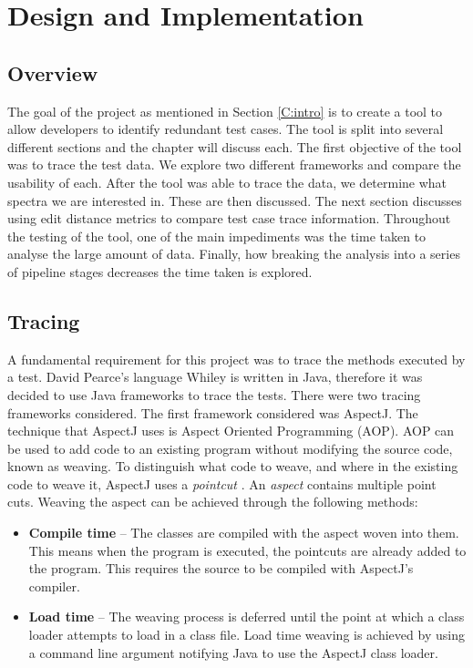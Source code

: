 \chapter{Design and Implementation}\label{C:workdone}

\section{Overview}

The goal of the project as mentioned in Section \ref{C:intro} is to create a tool to allow developers to identify redundant test cases. The tool is split into several different sections and the chapter will discuss each. The first objective of the tool was to trace the test data. We explore two different frameworks and compare the usability of each. After the tool was able to trace the data, we determine what spectra we are interested in. These are then discussed. The next section discusses using edit distance metrics to compare test case trace information. Throughout the testing of the tool, one of the main impediments was the time taken to analyse the large amount of data. Finally, how breaking the analysis into a series of pipeline stages decreases the time taken is explored.

\section{Tracing}
\label{S:trace}
A fundamental requirement for this project was to trace the methods executed by a test. David Pearce's language Whiley is written in Java, therefore it was decided to use Java frameworks to trace the tests. There were two tracing frameworks considered. The first framework considered was AspectJ. The technique that AspectJ uses is Aspect Oriented Programming (AOP). AOP can be used to add code to an existing program without modifying the source code, known as weaving. To distinguish what code to weave, and where in the existing code to weave it, AspectJ uses a \textit{pointcut} \cite{aspectj}. An \textit{aspect} contains multiple point cuts. Weaving the aspect can be achieved through the following methods:

\begin{itemize}
\item \textbf{Compile time} --
The classes are compiled with the aspect woven into them. This means when the program is executed, the pointcuts are already added to the program. This requires the source to be compiled with AspectJ's compiler.
\item \textbf{Load time} --
The weaving process is deferred until the point at which a class loader attempts to load in a class file. Load time weaving is achieved by using a command line argument notifying Java to use the AspectJ class loader.
\end{itemize}

